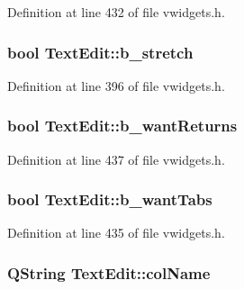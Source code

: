 Definition at line 432 of file vwidgets.h.

\hypertarget{classTextEdit_a19bd4ec1ee98f319933d33f9afe170b8}{
\subsubsection[{b\_\-stretch}]{\setlength{\rightskip}{0pt plus 5cm}bool {\bf TextEdit::b\_\-stretch}}}
\label{classTextEdit_a19bd4ec1ee98f319933d33f9afe170b8}


Definition at line 396 of file vwidgets.h.

\hypertarget{classTextEdit_acb631018a7719b9caf0f7b8e2d767e0c}{
\subsubsection[{b\_\-wantReturns}]{\setlength{\rightskip}{0pt plus 5cm}bool {\bf TextEdit::b\_\-wantReturns}}}
\label{classTextEdit_acb631018a7719b9caf0f7b8e2d767e0c}


Definition at line 437 of file vwidgets.h.

\hypertarget{classTextEdit_ac4121b5656c89217fe95853d9a3811ce}{
\subsubsection[{b\_\-wantTabs}]{\setlength{\rightskip}{0pt plus 5cm}bool {\bf TextEdit::b\_\-wantTabs}}}
\label{classTextEdit_ac4121b5656c89217fe95853d9a3811ce}


Definition at line 435 of file vwidgets.h.

\hypertarget{classTextEdit_afa84afb50eea1aee08fe4ae71bb4239e}{
\subsubsection[{colName}]{\setlength{\rightskip}{0pt plus 5cm}QString {\bf TextEdit::colName}}}
\label{classTextEdit_afa84afb50eea1aee08fe4ae71bb4239e}


